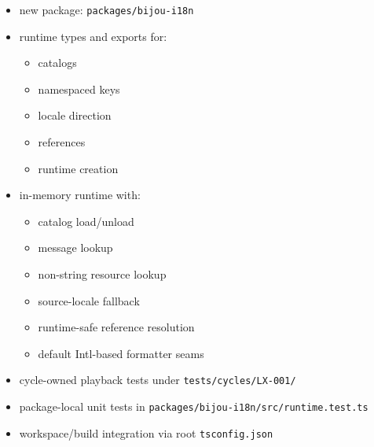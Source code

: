 \begin{itemize}
\tightlist
\item
  new package: \texttt{p\allowbreak{}a\allowbreak{}c\allowbreak{}k\allowbreak{}a\allowbreak{}g\allowbreak{}e\allowbreak{}s\allowbreak{}/\allowbreak{}b\allowbreak{}i\allowbreak{}j\allowbreak{}o\allowbreak{}u\allowbreak{}-\allowbreak{}i\allowbreak{}1\allowbreak{}8\allowbreak{}n}
\item
  runtime types and exports for:

  \begin{itemize}
  \tightlist
  \item
    catalogs
  \item
    namespaced keys
  \item
    locale direction
  \item
    references
  \item
    runtime creation
  \end{itemize}
\item
  in-memory runtime with:

  \begin{itemize}
  \tightlist
  \item
    catalog load/unload
  \item
    message lookup
  \item
    non-string resource lookup
  \item
    source-locale fallback
  \item
    runtime-safe reference resolution
  \item
    default Intl-based formatter seams
  \end{itemize}
\item
  cycle-owned playback tests under \texttt{t\allowbreak{}e\allowbreak{}s\allowbreak{}t\allowbreak{}s\allowbreak{}/\allowbreak{}c\allowbreak{}y\allowbreak{}c\allowbreak{}l\allowbreak{}e\allowbreak{}s\allowbreak{}/\allowbreak{}L\allowbreak{}X\allowbreak{}-\allowbreak{}0\allowbreak{}0\allowbreak{}1\allowbreak{}/}
\item
  package-local unit tests in \texttt{p\allowbreak{}a\allowbreak{}c\allowbreak{}k\allowbreak{}a\allowbreak{}g\allowbreak{}e\allowbreak{}s\allowbreak{}/\allowbreak{}b\allowbreak{}i\allowbreak{}j\allowbreak{}o\allowbreak{}u\allowbreak{}-\allowbreak{}i\allowbreak{}1\allowbreak{}8\allowbreak{}n\allowbreak{}/\allowbreak{}s\allowbreak{}r\allowbreak{}c\allowbreak{}/\allowbreak{}r\allowbreak{}u\allowbreak{}n\allowbreak{}t\allowbreak{}i\allowbreak{}m\allowbreak{}e\allowbreak{}.\allowbreak{}t\allowbreak{}e\allowbreak{}s\allowbreak{}t\allowbreak{}.\allowbreak{}t\allowbreak{}s}
\item
  workspace/build integration via root \texttt{t\allowbreak{}s\allowbreak{}c\allowbreak{}o\allowbreak{}n\allowbreak{}f\allowbreak{}i\allowbreak{}g\allowbreak{}.\allowbreak{}j\allowbreak{}s\allowbreak{}o\allowbreak{}n}
\end{itemize}

